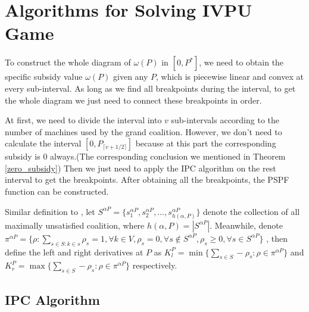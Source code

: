\section{Algorithms for Solving IVPU Game}
To construct the whole diagram of $\omega(P)$ in $[0,P^*]$, we need to obtain the specific subsidy value $\omega(P)$ given any $P$, which is piecewise linear and convex at every sub-interval. As long as we find all breakpoints during the interval, to get the whole diagram we just need to connect these breakpoints in order.

At first, we need to divide the interval into $v$ sub-intervals according to the number of machines used by the grand coalition. However, we don't need to calculate the interval $[0,P_{\lceil v+1/2 \rceil}]$ because at this part the corresponding subsidy is 0 always.(The corresponding conclusion we mentioned in Theorem \ref{zero_subsidy})
Then we just need to apply the IPC algorithm on the rest interval to get the breakpoints. After obtaining all the breakpoints, the PSPF function can be constructed.

Similar definition to \cite{liu2018simultaneous}, let $S^{\alpha P} = \{s_1^{\alpha P}, s_2^{\alpha P}, \ldots, s_{h(\alpha,P)}^{\alpha P}\}$ denote the collection of all maximally unsatisfied coalition, where $h(\alpha,P)= |S^{\alpha P}|$. Meanwhile, denote $\pi^{\alpha P} = \{ \rho:\sum_{s\in S:k\in s}\rho_s=1,\forall k \in V, \rho_s = 0,\forall s \notin S^{\alpha P}, \rho_s\geq 0,\forall s \in S^{\alpha P}\}$
, then define the left and right derivatives at $P$ as $K_{l}^{P} = \min\{\sum_{s\in S} -\rho_s: \rho \in \pi^{\alpha P}\}$ and $K_{r}^{P} = \max\{\sum_{s\in S} -\rho_s: \rho \in \pi^{\alpha P}\}$ respectively.

\subsection{IPC Algorithm}

